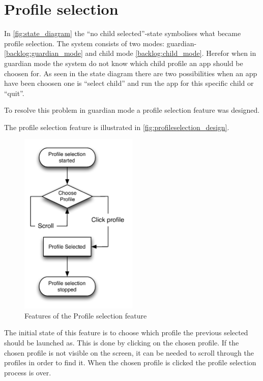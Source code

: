\section{Profile selection}
\label{design:profile_selection}
In \autoref{fig:state_diagram} the ``no child selected''-state symbolises what became profile selection. The \giraf[] system consists of two modes: guardian- \autoref{backlog:guardian_mode} and child mode \autoref{backlog:child_mode}. Herefor when in guardian mode the system do not know which child profile an app should be choosen for. As seen in the state diagram there are two possibilities when an app have been choosen one is ``select child'' and run the app for this specific child or ``quit''.


To resolve this problem in guardian mode a profile selection feature was designed.

The profile selection feature is illustrated in \autoref{fig:profileselection_design}. 
\label{design:profile_selection}
\begin{figure}[h]
	\centering
	\includegraphics[width=0.5\textwidth]{gfx/profileselect_design.pdf}
	\caption{Features of the Profile selection feature}
	\label{fig:profileselection_design}
\end{figure}

The initial state of this feature is to choose which profile the previous selected should be launched as. This is done by clicking on the chosen profile. If the chosen profile is not visible on the screen, it can be needed to scroll through the profiles in order to find it. When the chosen profile is clicked the profile selection process is over.